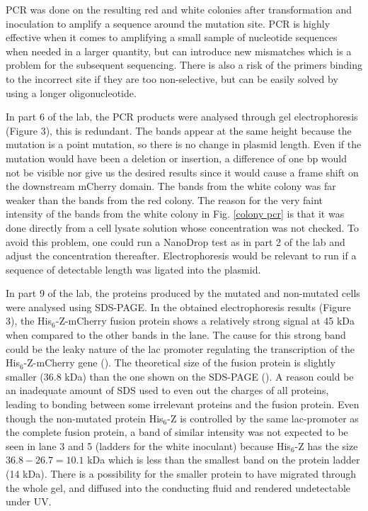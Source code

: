 \documentclass[11pt,a4paper]{article}
\begin{document}
PCR was done on the resulting red and white colonies after transformation and inoculation to amplify a sequence around the mutation site. PCR is highly effective when it comes to amplifying a small sample of nucleotide sequences when needed in a larger quantity, but can introduce new mismatches which is a problem for the subsequent sequencing. There is also a risk of the primers binding to the incorrect site if they are too non-selective, but can be easily solved by using a longer oligonucleotide.

In part 6 of the lab, the PCR products were analysed through gel electrophoresis (Figure 3), this is redundant. The bands appear at the same height because the mutation is a point mutation, so there is no change in plasmid length. Even if the mutation would have been a deletion or insertion, a difference of one bp would not be visible nor give us the desired results since it would cause a frame shift on the downstream mCherry domain. The bands from the white colony was far weaker than the bands from the red colony. The reason for the very faint intensity of the bands from the white colony in Fig. \ref{colony pcr} is that it was done directly from a cell lysate solution whose concentration was not checked. To avoid this problem, one could run a NanoDrop test as in part 2 of the lab and adjust the concentration thereafter. Electrophoresis would be relevant to run if a sequence of detectable length was ligated into the plasmid.

In part 9 of the lab, the proteins produced by the mutated and non-mutated cells were analysed using SDS-PAGE. In the obtained electrophoresis results (Figure 3), the His$_6$-Z-mCherry fusion protein shows a relatively strong signal at 45 kDa when compared to the other bands in the lane. The cause for this strong band could be the leaky nature of the lac promoter regulating the transcription of the His$_6$-Z-mCherry gene (\cite{labbkomp}). The theoretical size of the fusion protein is slightly smaller (36.8 kDa) than the one shown on the SDS-PAGE (\cite{labbkomp}). A reason could be an inadequate amount of SDS used to even out the charges of all proteins, leading to bonding between some irrelevant proteins and the fusion protein. Even though the non-mutated protein His$_6$-Z is controlled by the same lac-promoter as the complete fusion protein, a band of similar intensity was not expected to be seen in lane 3 and 5 (ladders for the white inoculant) because His$_6$-Z has the size $36.8-26.7=10.1$ kDa which is less than the smallest band on the protein ladder (14 kDa). There is a possibility for the smaller protein to have migrated through the whole gel, and diffused into the conducting fluid and rendered undetectable under UV. 
\end{document}
